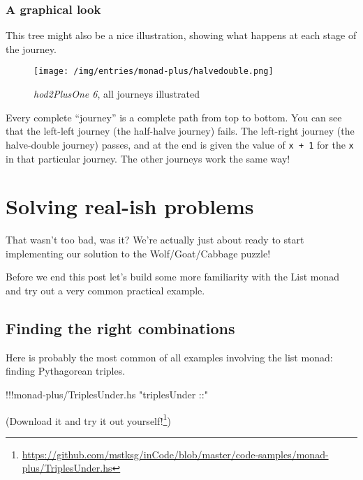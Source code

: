 \documentclass[]{article}
\newenvironment{Shaded}{}{}
\newcommand{\StringTok}[1]{\textcolor[rgb]{0.25,0.44,0.63}{{#1}}}
\newcommand{\FunctionTok}[1]{\textcolor[rgb]{0.02,0.16,0.49}{{#1}}}
\newcommand{\NormalTok}[1]{{#1}}
\renewcommand{\href}[2]{#2\footnote{\url{#1}}}
\begin{document}
\subsubsection{A graphical look}\label{a-graphical-look}

This tree might also be a nice illustration, showing what happens at
each stage of the journey.

\begin{figure}[htbp]
\centering
\texttt{[image: /img/entries/monad-plus/halvedouble.png]}
\caption{\emph{hod2PlusOne 6}, all journeys illustrated}
\end{figure}

Every complete ``journey'' is a complete path from top to bottom. You
can see that the left-left journey (the half-halve journey) fails. The
left-right journey (the halve-double journey) passes, and at the end is
given the value of \texttt{x\ +\ 1} for the \texttt{x} in that
particular journey. The other journeys work the same way!

\section{Solving real-ish problems}\label{solving-real-ish-problems}

That wasn't too bad, was it? We're actually just about ready to start
implementing our solution to the Wolf/Goat/Cabbage puzzle!

Before we end this post let's build some more familiarity with the List
monad and try out a very common practical example.

\subsection{Finding the right
combinations}\label{finding-the-right-combinations}

Here is probably the most common of all examples involving the list
monad: finding Pythagorean triples.

\begin{Shaded}
\begin{Highlighting}[]
\FunctionTok{!!!}\NormalTok{monad}\FunctionTok{-}\NormalTok{plus}\FunctionTok{/}\NormalTok{TriplesUnder.hs }\StringTok{"triplesUnder ::"}
\end{Highlighting}
\end{Shaded}

(\href{https://github.com/mstksg/inCode/blob/master/code-samples/monad-plus/TriplesUnder.hs}{Download
it and try it out yourself!})
\end{document}
